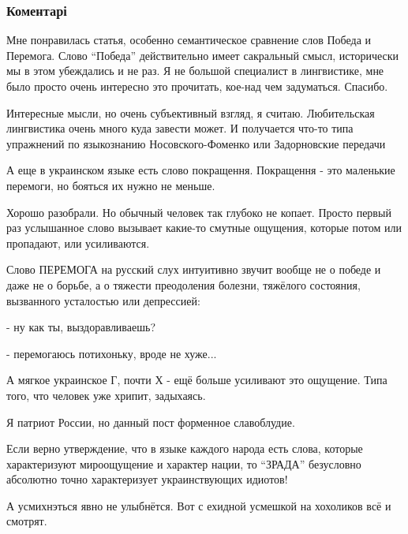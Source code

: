  
 
 
 
 
\subsubsection{Коментарі}
\label{sec:11_11_2020.yz.pozin_aleksandr.1.peremoga_ne_pobeda.cmt}

\begin{itemize} %

Мне понравилась статья, особенно семантическое сравнение слов Победа и
Перемога. Слово \enquote{Победа} действительно имеет сакральный смысл, исторически мы в
этом убеждались и не раз. Я не большой специалист в лингвистике, мне было
просто очень интересно это прочитать, кое-над чем задуматься. Спасибо.


Интересные мысли, но очень субъективный взгляд, я считаю. Любительская
лингвистика очень много куда завести может. И получается что-то типа упражнений
по языкознанию Носовского-Фоменко или Задорновские передачи


А еще в украинском языке есть слово покращення. Покращення - это маленькие
перемоги, но бояться их нужно не меньше.


Хорошо разобрали. Но обычный человек так глубоко не копает. Просто первый раз
услышанное слово вызывает какие-то смутные ощущения, которые потом или
пропадают, или усиливаются.

Слово ПЕРЕМОГА на русский слух интуитивно звучит вообще не о победе и даже не о
борьбе, а о тяжести преодоления болезни, тяжёлого состояния, вызванного
усталостью или депрессией:

- ну как ты, выздоравливаешь?

- перемогаюсь потихоньку, вроде не хуже...

А мягкое украинское Г, почти Х - ещё больше усиливают это ощущение. Типа того,
что человек уже хрипит, задыхаясь.


Я патриот России, но данный пост форменное славоблудие.

Если верно утверждение, что в языке каждого народа есть слова, которые
характеризуют мироощущение и характер нации, то \enquote{ЗРАДА} безусловно абсолютно
точно характеризует украинствующих идиотов!


А усмихнэться явно не улыбнётся. Вот с ехидной усмешкой на хохоликов всё и
смотрят.

\end{itemize} %
